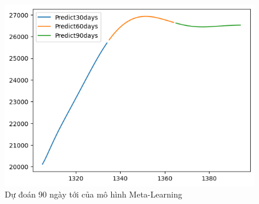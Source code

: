 \begin{figure}[H]
\begin{minipage}{0.15\textwidth}
    \includegraphics[width=1\textwidth]{resources/chapter-5/newdata1/predicted/EIB_ LSTM_9-1_30days.png}
    \end{minipage}
    \hfill
    
    \caption{Dự đoán 90 ngày tới của mô hình Meta-Learning}
    \label{fig:ml_predicted}
\end{figure}


